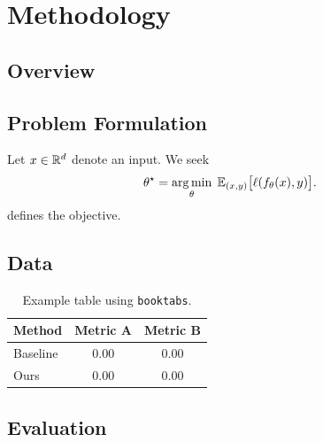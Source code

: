 \section{Methodology}
\label{sec:methodology}

\subsection{Overview}
\label{sec:method-overview}
\lipsum[3]


\subsection{Problem Formulation}
\label{sec:formulation}
Let $x \in \mathbb{R}^d$ denote an input. We seek
\begin{equation}
  \theta^\star = \operatorname*{arg\,min}_{\theta} \; \mathbb{E}_{(x,y)}\big[\ell(f_\theta(x), y)\big].
  \label{eq:objective}
\end{equation}
 defines the objective.

\subsection{Data}
\label{sec:data}

\begin{table}[t]
  \centering
  \caption{Example table using \texttt{booktabs}.}
  \label{tab:example}
  \begin{tabular}{lcc}
    \toprule
    Method & Metric A & Metric B \\
    \midrule
    Baseline & 0.00 & 0.00 \\
    Ours     & 0.00 & 0.00 \\
    \bottomrule
  \end{tabular}
\end{table}

\subsection{Evaluation}
\label{sec:evaluation}
